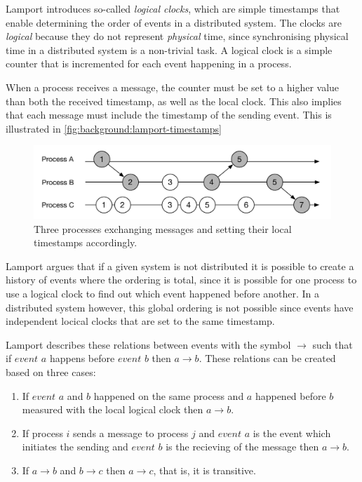 		\newpar Lamport introduces so-called \textit{logical clocks}, which are simple timestamps that enable determining the order of events in a distributed system. The clocks are \textit{logical} because they do not represent \textit{physical} time, since synchronising physical time in a distributed system is a non-trivial task. A logical clock is a simple counter that is incremented for each event happening in a process. 
		
		When a process receives a message, the counter must be set to a higher value than both the received timestamp, as well as the local clock. This also implies that each message must include the timestamp of the sending event. This is illustrated in \autoref{fig:background:lamport-timestamps}
		
		\begin{figure}[H]
		\centering
		\includegraphics[width=\textwidth]{2background/images/lamport-timestamps.pdf}
		\caption{Three processes exchanging messages and setting their local timestamps accordingly.}
		\label{fig:background:lamport-timestamps}
		\end{figure}
		
		\newpar Lamport argues that if a given system is not distributed it is possible to create a history of events where the ordering is total, since it is possible for one process to use a logical clock to find out which event happened before another. In a distributed system however, this global ordering is not possible since events have independent locical clocks that are set to the same timestamp.
		
		\newpar Lamport describes these relations between events with the symbol $\rightarrow$ such that if $event$ $a$ happens before $event$ $b$ then $a \rightarrow b$. These relations can be created based on three cases:
        
        \begin{enumerate}
        	\item If $event$ $a$ and $b$ happened on the same process and $a$ happened before $b$ measured with the local logical clock then $a \rightarrow b$.
            \item If process $i$ sends a message to process $j$ and $event$ $a$ is the event which initiates the sending and $event$ $b$ is the recieving of the message then $a \rightarrow b$.
            \item If $a \rightarrow b$ and $b \rightarrow c$ then $a \rightarrow c$, that is, it is transitive.
        \end{enumerate}
        
